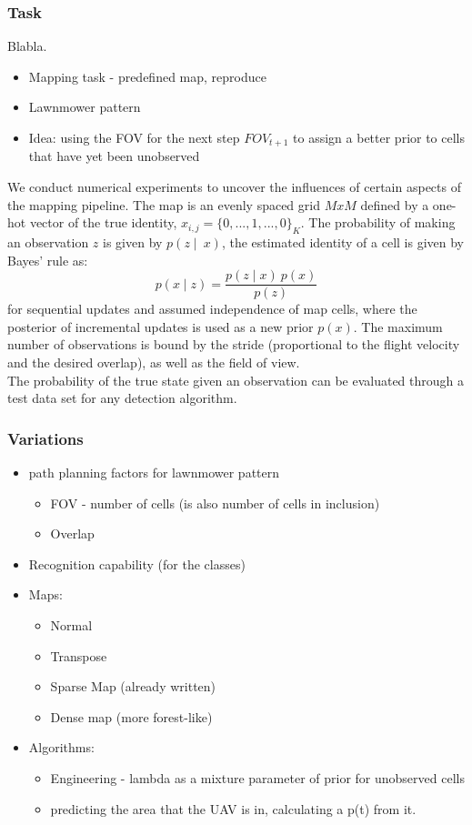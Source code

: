\documentclass[twocolumn,letterpaper]{IEEEAerospaceCLS}  %
\begin{document}
\subsubsection{Task}
Blabla.
\begin{itemize}
    \item Mapping task - predefined map, reproduce
    \item Lawnmower pattern
    \item Idea: using the FOV for the next step $FOV_{t+1}$ to assign a better prior to cells that have yet been unobserved
\end{itemize}
We conduct numerical experiments to uncover the influences of certain aspects of the mapping pipeline. The map is an evenly spaced grid $MxM$ defined by a one-hot vector of the true identity, $x_{i,j} = \{0,..., 1, ..., 0\}_K$. The probability of making an observation $z$ is given by $p(z\mid~x)$, the estimated identity of a cell is given by Bayes' rule as:
\begin{equation}
    p(x \mid z) = \frac{p(z \mid x)~p(x)}{p(z)}
\end{equation}
for sequential updates and assumed independence of map cells, where the posterior of incremental updates is used as a new prior $p(x)$. The maximum number of observations is bound by the stride (proportional to the flight velocity and the desired overlap), as well as the field of view.\\
The probability of the true state given an observation can be evaluated through a test data set for any detection algorithm.
\subsubsection{Variations}
\begin{itemize}
    \item path planning factors for lawnmower pattern
    \begin{itemize}
        \item FOV - number of cells (is also number of cells in inclusion)
        \item Overlap
    \end{itemize}
    \item Recognition capability (for the classes)
    \item Maps:
    \begin{itemize}
        \item Normal
        \item Transpose
        \item Sparse Map (already written)
        \item Dense map (more forest-like)
    \end{itemize}
    \item Algorithms:
    \begin{itemize}
        \item Engineering - lambda as a mixture parameter of prior for unobserved cells 
        \item predicting the area that the UAV is in, calculating a p(t) from it.
    \end{itemize}
\end{itemize}
\end{document}
